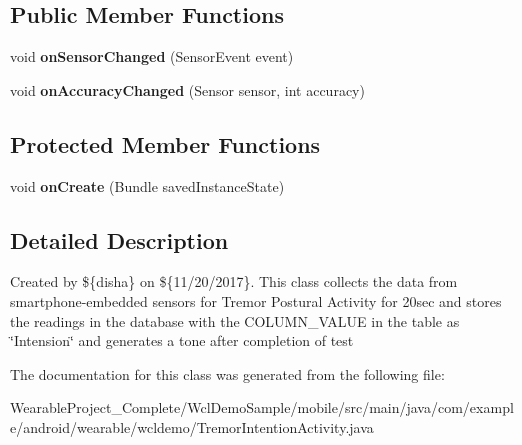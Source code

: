 \subsection*{Public Member Functions}
\begin{DoxyCompactItemize}
\item 
void {\bfseries on\+Sensor\+Changed} (Sensor\+Event event)\hypertarget{classcom_1_1example_1_1android_1_1wearable_1_1wcldemo_1_1TremorIntentionActivity_adf5789c69e2de89b36894200176cd633}{}\label{classcom_1_1example_1_1android_1_1wearable_1_1wcldemo_1_1TremorIntentionActivity_adf5789c69e2de89b36894200176cd633}

\item 
void {\bfseries on\+Accuracy\+Changed} (Sensor sensor, int accuracy)\hypertarget{classcom_1_1example_1_1android_1_1wearable_1_1wcldemo_1_1TremorIntentionActivity_a63dfe2ade4d0d5c05bb569b86bf53628}{}\label{classcom_1_1example_1_1android_1_1wearable_1_1wcldemo_1_1TremorIntentionActivity_a63dfe2ade4d0d5c05bb569b86bf53628}

\end{DoxyCompactItemize}
\subsection*{Protected Member Functions}
\begin{DoxyCompactItemize}
\item 
void {\bfseries on\+Create} (Bundle saved\+Instance\+State)\hypertarget{classcom_1_1example_1_1android_1_1wearable_1_1wcldemo_1_1TremorIntentionActivity_ae879abe4a6b7f8b932bae6b2f24f248b}{}\label{classcom_1_1example_1_1android_1_1wearable_1_1wcldemo_1_1TremorIntentionActivity_ae879abe4a6b7f8b932bae6b2f24f248b}

\end{DoxyCompactItemize}


\subsection{Detailed Description}
Created by \$\{disha\} on \$\{11/20/2017\}. This class collects the data from smartphone-\/embedded sensors for Tremor Postural Activity for 20sec and stores the readings in the database with the C\+O\+L\+U\+M\+N\+\_\+\+V\+A\+L\+UE in the table as \char`\"{}\+Intension\char`\"{} and generates a tone after completion of test 

The documentation for this class was generated from the following file\+:\begin{DoxyCompactItemize}
\item 
Wearable\+Project\+\_\+\+Complete/\+Wcl\+Demo\+Sample/mobile/src/main/java/com/example/android/wearable/wcldemo/Tremor\+Intention\+Activity.\+java\end{DoxyCompactItemize}
